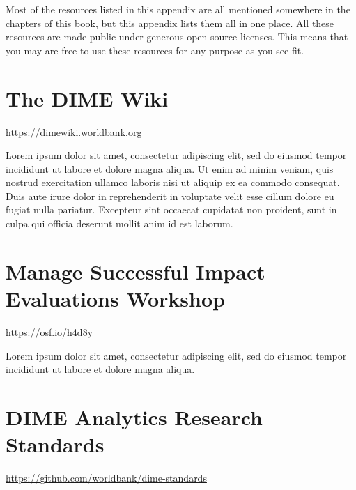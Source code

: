 
\begin{fullwidth}

Most of the resources listed in this appendix are all mentioned somewhere in
the chapters of this book, but this appendix lists them all in one place. All
these resources are made public under generous open-source licenses. This means
that you may are free to use these resources for any purpose as you see fit.

\end{fullwidth}


\filbreak
\section{The DIME Wiki}
\url{https://dimewiki.worldbank.org}
\vspace{\baselineskip}

\noindent Lorem ipsum dolor sit amet, consectetur adipiscing elit, sed do eiusmod tempor incididunt ut labore et dolore magna aliqua. Ut enim ad minim veniam, quis nostrud exercitation ullamco laboris nisi ut aliquip ex ea commodo consequat. Duis aute irure dolor in reprehenderit in voluptate velit esse cillum dolore eu fugiat nulla pariatur. Excepteur sint occaecat cupidatat non proident, sunt in culpa qui officia deserunt mollit anim id est laborum.


\filbreak
\section{Manage Successful Impact Evaluations Workshop}
\url{https://osf.io/h4d8y}
\vspace{\baselineskip}

\noindent Lorem ipsum dolor sit amet, consectetur adipiscing elit, sed do eiusmod tempor incididunt ut labore et dolore magna aliqua.


\filbreak
\section{DIME Analytics Research Standards}
\url{https://github.com/worldbank/dime-standards}
\vspace{\baselineskip}

